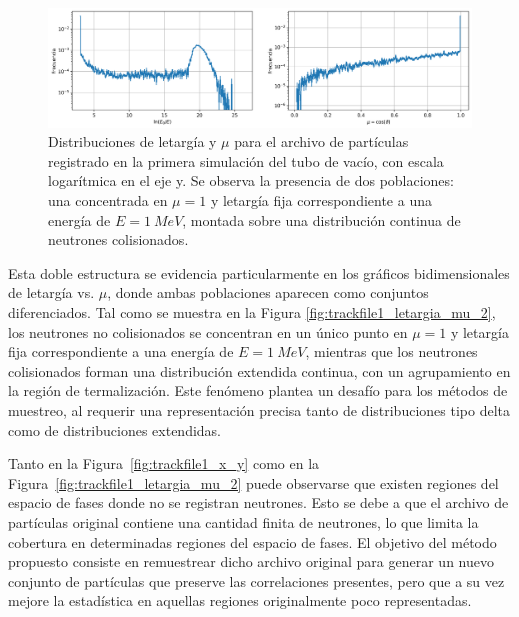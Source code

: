 \begin{figure}[H]
    \centering
    \includegraphics[width=\textwidth]{figs/fig4_2.png}
    \caption{Distribuciones de letargía y $\mu$ para el archivo de partículas registrado en la primera simulación del tubo de vacío, con escala logarítmica en el eje y. Se observa la presencia de dos poblaciones: una concentrada en $\mu = 1$ y letargía fija correspondiente a una energía de $E = 1~MeV$, montada sobre una distribución continua de neutrones colisionados.}
    \label{fig:trackfile1_letargia_mu}
\end{figure}

Esta doble estructura se evidencia particularmente en los gráficos bidimensionales de letargía vs. $\mu$, donde ambas poblaciones aparecen como conjuntos diferenciados. Tal como se muestra en la Figura \ref{fig:trackfile1_letargia_mu_2}, los neutrones no colisionados se concentran en un único punto en $\mu = 1$ y letargía fija correspondiente a una energía de $E = 1~MeV$, mientras que los neutrones colisionados forman una distribución extendida continua, con un agrupamiento en la región de termalización. Este fenómeno plantea un desafío para los métodos de muestreo, al requerir una representación precisa tanto de distribuciones tipo delta como de distribuciones extendidas.


Tanto en la Figura~\ref{fig:trackfile1_x_y} como en la Figura~\ref{fig:trackfile1_letargia_mu_2} puede observarse que existen regiones del espacio de fases donde no se registran neutrones. Esto se debe a que el archivo de partículas original contiene una cantidad finita de neutrones, lo que limita la cobertura en determinadas regiones del espacio de fases. El objetivo del método propuesto consiste en remuestrear dicho archivo original para generar un nuevo conjunto de partículas que preserve las correlaciones presentes, pero que a su vez mejore la estadística en aquellas regiones originalmente poco representadas.


